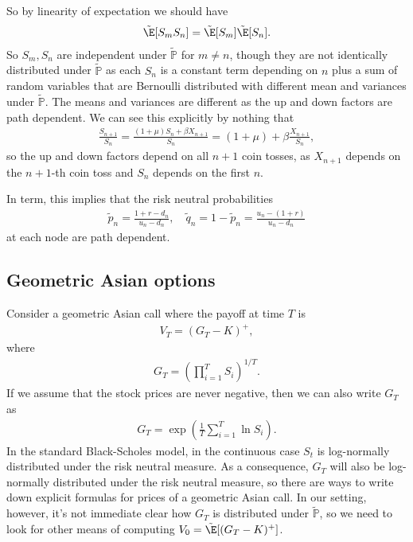 So by linearity of expectation we should have 
\begin{align}
	 \tilde{\E}[S_m S_n] = \tilde{\E}[S_m] \tilde{\E}[S_n].
\end{align}
So $S_m, S_n$ are independent under $\tilde{\mathbb{P}}$ for $m \neq n$, though they are not identically distributed under $\tilde{\mathbb{P}}$ as each $S_n$ is a constant term depending on $n$ plus a sum of random variables that are Bernoulli distributed with different mean and variances under $\tilde{\mathbb{P}}$. The means and variances are different as the up and down factors are path dependent. We can see this explicitly by nothing that 
\begin{align}
	 \frac{S_{n+1}}{S_n} = \frac{(1+\mu)S_{n} + \beta X_{n+1}}{S_n} = (1+\mu) + \beta \frac{X_{n+1}}{S_n},
\end{align}
so the up and down factors depend on all $n+1$ coin tosses, as $X_{n+1}$ depends on the $n+1$-th coin toss and $S_n$ depends on the first $n$. 

In term, this implies that the risk neutral probabilities 
\begin{align}
	 \tilde{p}_n = \frac{1 + r - d_n}{u_n-d_n}, \quad \tilde{q}_n = 1 - \tilde{p}_n = \frac{u_n - (1+r)}{u_n-d_n}
\end{align}
at each node are path dependent. 

\subsection{Geometric Asian options}
Consider a geometric Asian call where the payoff at time $T$ is 
\begin{align}
	 V_T = (G_T - K)^+, 
\end{align}
where 
\begin{align}
	 G_T = \left( \prod_{i=1}^T S_i \right)^{1/T}.
\end{align}
If we assume that the stock prices are never negative, then we can also write $G_T$ as 
\begin{align}
	 G_T = \exp \left( \frac{1}{T} \sum_{i=1}^T \ln S_i \right).
\end{align}
In the standard Black-Scholes model, in the continuous case $S_t$ is log-normally distributed under the risk neutral measure. As a consequence, $G_T$ will also be log-normally distributed under the risk neutral measure, so there are ways to write down explicit formulas for prices of a geometric Asian call. In our setting, however, it's not immediate clear how $G_T$ is distributed under $\tilde{\mathbb{P}}$, so we need to look for other means of computing $V_0 = \tilde{\E}[(G_T - K)^+]$. 

